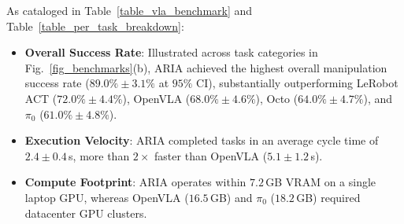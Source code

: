 \documentclass[journal]{IEEEtran}
\begin{document}
As cataloged in Table~\ref{table_vla_benchmark} and Table~\ref{table_per_task_breakdown}:
\begin{itemize}
    \item \textbf{Overall Success Rate}: Illustrated across task categories in Fig.~\ref{fig_benchmarks}(b), ARIA achieved the highest overall manipulation success rate ($\mathbf{89.0\% \pm 3.1\%}$ at $95\%$ CI), substantially outperforming LeRobot ACT ($72.0\% \pm 4.4\%$), OpenVLA ($68.0\% \pm 4.6\%$), Octo ($64.0\% \pm 4.7\%$), and $\pi_0$ ($61.0\% \pm 4.8\%$).
    \item \textbf{Execution Velocity}: ARIA completed tasks in an average cycle time of $\mathbf{2.4 \pm 0.4}$\,s, more than $2\times$ faster than OpenVLA ($5.1 \pm 1.2$\,s).
    \item \textbf{Compute Footprint}: ARIA operates within $7.2$\,GB VRAM on a single laptop GPU, whereas OpenVLA ($16.5$\,GB) and $\pi_0$ ($18.2$\,GB) required datacenter GPU clusters.
\end{itemize}
\end{document}
